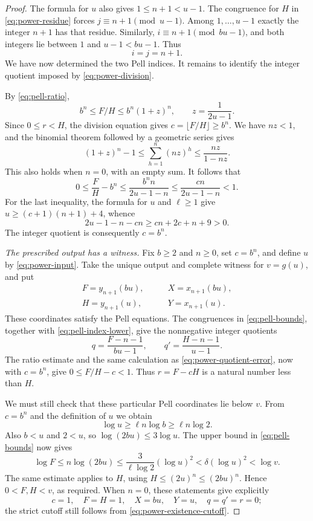 \begin{proof}
The formula for $u$ also gives $1\le n+1<u-1$.
The congruence for $H$ in \eqref{eq:power-residue} forces
$j\equiv n+1\pmod{u-1}$.  Among $1,\ldots,u-1$ exactly the
integer $n+1$ has that residue.  Similarly,
$i\equiv n+1\pmod{bu-1}$, and both integers lie between $1$ and
$u-1<bu-1$.  Thus
\begin{equation}\label{eq:pinned-pell-indices}
 i=j=n+1.
\end{equation}
We have now determined the two Pell indices.  It remains to identify
the integer quotient imposed by \eqref{eq:power-division}.

By \eqref{eq:pell-ratio},
\[
 b^n\le F/H\le b^n(1+z)^n,
 \qquad z=\frac1{2u-1}.
\]
Since $0\le r<H$, the division equation gives
$c=\lfloor F/H\rfloor\ge b^n$.
We have $nz<1$, and the binomial theorem followed by a geometric
series gives
\[
 (1+z)^n-1
 \le\sum_{h=1}^{n}(nz)^h
 \le\frac{nz}{1-nz}.
\]
This also holds when $n=0$, with an empty sum.  It follows that
\begin{equation}\label{eq:power-quotient-error}
 0\le \frac FH-b^n
 \le\frac{b^n n}{2u-1-n}
 \le\frac{cn}{2u-1-n}<1.
\end{equation}
For the last inequality, the formula for $u$ and $\ell\ge1$ give
$u\ge(c+1)(n+1)+4$, whence
\[
 2u-1-n-cn\ge cn+2c+n+9>0.
\]
The integer quotient is consequently $c=b^n$.

\smallskip
\noindent\emph{The prescribed output has a witness.}
Fix $b\ge2$ and $n\ge0$, set $c=b^n$, and define $u$ by
\eqref{eq:power-input}.  Take the unique output and complete witness
for $v=g(u)$, and put
\[
 \begin{split}
 F=y_{n+1}(bu),&\qquad X=x_{n+1}(bu),\\
 H=y_{n+1}(u),&\qquad Y=x_{n+1}(u).
 \end{split}
\]
These coordinates satisfy the Pell equations.
The congruences in \eqref{eq:pell-bounds}, together with
\eqref{eq:pell-index-lower}, give the nonnegative integer quotients
\[
 q=\frac{F-n-1}{bu-1},\qquad
 q'=\frac{H-n-1}{u-1}.
\]
The ratio estimate and the same calculation as
\eqref{eq:power-quotient-error}, now with $c=b^n$, give
$0\le F/H-c<1$.  Thus $r=F-cH$ is a natural number less than $H$.

We must still check that these particular Pell coordinates lie below
$v$.  From $c=b^n$ and the definition of $u$ we obtain
\[
 \log u\ge\ell n\log b\ge\ell n\log2.
\]
Also $b<u$ and $2<u$, so $\log(2bu)\le3\log u$.
The upper bound in \eqref{eq:pell-bounds} now gives
\begin{equation}\label{eq:power-existence-cutoff}
 \log F\le n\log(2bu)
 \le\frac3{\ell\log2}(\log u)^2
 <\delta(\log u)^2<\log v.
\end{equation}
The same estimate applies to $H$, using
$H\le(2u)^n\le(2bu)^n$.  Hence $0<F,H<v$, as required.
When $n=0$, these statements give explicitly
\[
 c=1,\quad F=H=1,\quad X=bu,\quad Y=u,
 \quad q=q'=r=0;
\]
the strict cutoff still follows from
\eqref{eq:power-existence-cutoff}.


\end{proof}
